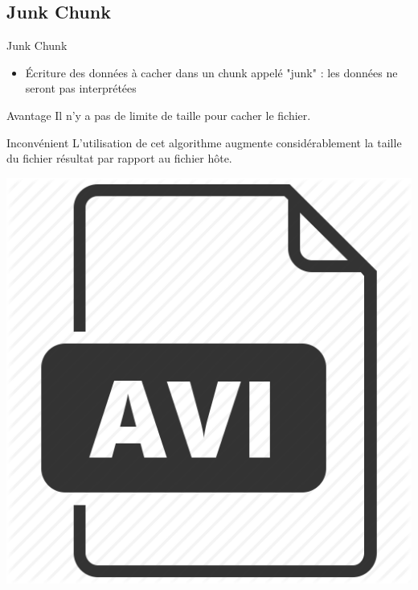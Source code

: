 \documentclass{beamer}
\begin{document}
    \subsection{Junk Chunk}
    \begin{frame}
    
	\begin{block}{Junk Chunk}
	\begin{itemize}
	[circle]
	\item Écriture des données à cacher dans un chunk appelé "junk" : les 
	données ne seront pas interprétées  
	\end{itemize}
	\end{block}
	
	\begin{exampleblock}{Avantage} 
	Il n'y a pas de limite de taille pour cacher le fichier. 
	\end{exampleblock}
	
	\begin{alertblock}{Inconvénient} 
	L'utilisation de cet algorithme augmente considérablement la taille du 
	fichier résultat par rapport au fichier hôte. 
	\end{alertblock}
	
	\hspace{4.4cm}
    \includegraphics[scale=0.08]{pictures/avi-512.png}
    
    \end{frame}
     
\end{document}
